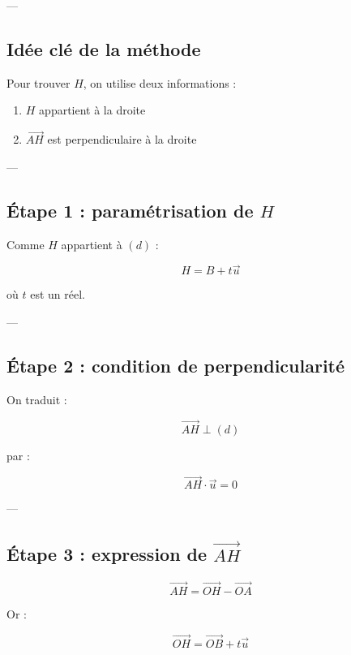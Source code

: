 \documentclass[11pt,a4paper]{article}
\begin{document}
---

\subsection{Idée clé de la méthode}

Pour trouver $H$, on utilise deux informations :

\begin{enumerate}
\item $H$ appartient à la droite
\item $\vec{AH}$ est perpendiculaire à la droite
\end{enumerate}

---

\subsection{Étape 1 : paramétrisation de $H$}

Comme $H$ appartient à $(d)$ :

\[
\boxed{
H = B + t\vec{u}
}
\]

où $t$ est un réel.

---

\subsection{Étape 2 : condition de perpendicularité}

On traduit :

\[
\vec{AH} \perp (d)
\]

par :

\[
\boxed{
\vec{AH} \cdot \vec{u} = 0
}
\]

---

\subsection{Étape 3 : expression de $\vec{AH}$}

\[
\vec{AH} = \vec{OH} - \vec{OA}
\]

Or :

\[
\vec{OH} = \vec{OB} + t\vec{u}
\]
\end{document}
